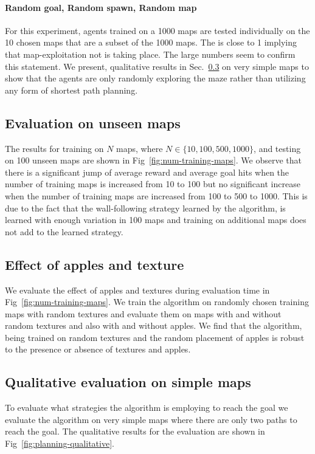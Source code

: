 \paragraph{Random goal, Random spawn, Random map}
For this experiment, agents trained on a 1000 maps are tested individually on the 10 chosen maps that are a subset of the 1000 maps.
The \LatencyOneGtOne{} is close to 1 implying that map-exploitation not is taking place.
The large \DistanceInefficiency{} numbers seem to confirm this statement.
We present, qualitative results in  Sec.~\ref{sec:qualitative-simple} on very simple maps to show that the agents are only randomly exploring the maze rather than utilizing any form of shortest path planning.

\subsection{Evaluation on unseen maps}
The results for training on $N$ maps, where $N \in \{10, 100, 500, 1000\}$, and testing on 100 unseen maps are shown in Fig~\ref{fig:num-training-maps}.
We observe that there is a significant jump of average reward and average goal hits when the number of training maps is increased from 10 to 100 but no significant increase when the number of training maps are increased from 100 to 500 to 1000.
This is due to the fact that the wall-following strategy learned by the algorithm,
is learned with enough variation in 100 maps and training on additional maps does not add to the learned strategy.

\subsection{Effect of apples and texture}
We evaluate the effect of apples and textures during evaluation time in Fig~\ref{fig:num-training-maps}.
We train the algorithm on randomly chosen training maps with random textures and evaluate them on maps with and without random textures and also with and without apples. 
We find that the algorithm, being trained on random textures and the random placement of apples is robust to the presence or absence of textures and apples.


\subsection{Qualitative evaluation on simple maps}
\label{sec:qualitative-simple}
To evaluate what strategies the algorithm is employing to reach the
goal we evaluate the algorithm on very simple maps where there are only two
paths to reach the goal. The qualitative results for the evaluation are shown
in Fig~\ref{fig:planning-qualitative}.


